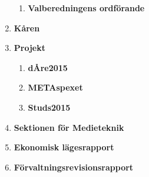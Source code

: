 \documentclass{protokoll}
\begin{document}
\begin{enumerate}
\begin{enumerate}
        \item \textbf{Valberedningens ordförande} 
      \end{enumerate}
    \item \textbf{Kåren}
    \item \textbf{Projekt}
      \begin{enumerate}
        \item \textbf{dÅre2015}
        \item \textbf{METAspexet}
        \item \textbf{Studs2015}
      \end{enumerate}
    \item \textbf{Sektionen för Medieteknik}
    \item \textbf{Ekonomisk lägesrapport}
    \item \textbf{Förvaltningsrevisionsrapport}
  \end{enumerate}






\end{document}
